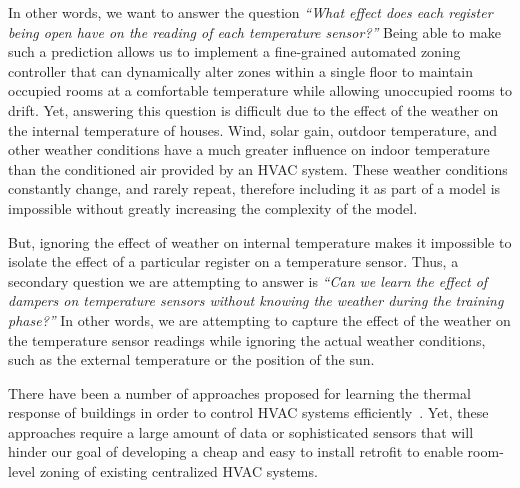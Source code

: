 In other words, we want to answer the question {\em ``What effect does each
  register being open have on the reading of each temperature sensor?''}  Being
able to make such a prediction allows us to implement a fine-grained automated
zoning controller that can dynamically alter zones within a single floor to
maintain occupied rooms at a comfortable temperature while allowing unoccupied
rooms to drift. Yet, answering this question is difficult due to the effect of
the weather on the internal temperature of houses. Wind, solar gain, outdoor
temperature, and other weather conditions have a much greater influence on
indoor temperature than the conditioned air provided by an HVAC system. These
weather conditions constantly change, and rarely repeat, therefore including it
as part of a model is impossible without greatly increasing the complexity of
the model. 

But, ignoring the effect of weather on internal temperature makes it impossible
to isolate the effect of a particular register on a temperature sensor. Thus, a
secondary question we are attempting to answer is {\em ``Can we learn the effect
  of dampers on temperature sensors without knowing the weather during the
  training phase?''} In other words, we are attempting to capture the effect of
the weather on the temperature sensor readings while ignoring the actual weather
conditions, such as the external temperature or the position of the sun.

There have been a number of approaches proposed for learning the thermal
response of buildings in order to control HVAC systems
efficiently~\cite{Henze2004,Deng2010,Oldewurtel2010,Ma2011,Nghiem2011,Aswani2011}. Yet,
these approaches require a large amount of data or sophisticated sensors that
will hinder our goal of developing a cheap and easy to install retrofit to
enable room-level zoning of existing centralized HVAC systems.

